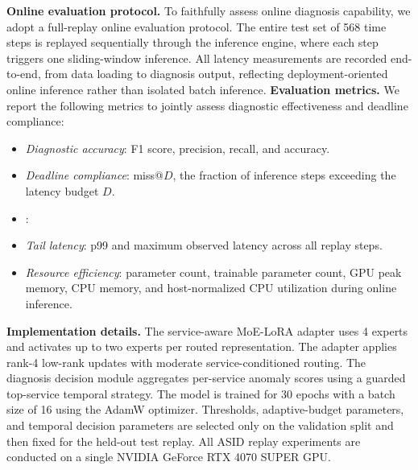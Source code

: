 \textbf{Online evaluation protocol.}
To faithfully assess online diagnosis capability, we adopt a full-replay online evaluation protocol. The entire test set of 568 time steps is replayed sequentially through the inference engine, where each step triggers one sliding-window inference. All latency measurements are recorded end-to-end, from data loading to diagnosis output, reflecting deployment-oriented online inference rather than isolated batch inference.
\textbf{Evaluation metrics.}
We report the following metrics to jointly assess diagnostic effectiveness and deadline compliance:
\begin{itemize}
    \item \textit{Diagnostic accuracy}: F1 score, precision, recall, and accuracy.
    \item \textit{Deadline compliance}: miss@$D$, the fraction of inference steps exceeding the latency budget $D$.
    \item \textit{}: 
    \item \textit{Tail latency}: p99 and maximum observed latency across all replay steps.
    \item \textit{Resource efficiency}: parameter count, trainable parameter count, GPU peak memory, CPU memory, and host-normalized CPU utilization during online inference.
\end{itemize}

\textbf{Implementation details.}
 The service-aware MoE-LoRA adapter uses 4 experts and activates up to two experts per routed representation. The adapter applies rank-4 low-rank updates with moderate service-conditioned routing. The diagnosis decision module aggregates per-service anomaly scores using a guarded top-service temporal strategy. The model is trained for 30 epochs with a batch size of 16 using the AdamW optimizer.  Thresholds, adaptive-budget parameters, and temporal decision parameters are selected only on the validation split and then fixed for the held-out test replay. All ASID replay experiments are conducted on a single NVIDIA GeForce RTX 4070 SUPER GPU. 

